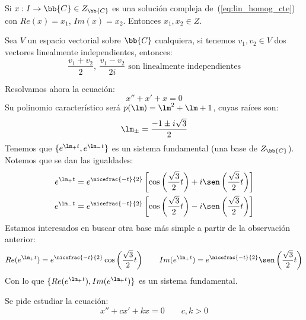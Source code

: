 \begin{prop}
    Si $x:I\rightarrow\bb{C}\in Z_{\bb{C}}$ es una solución compleja de~(\ref{eq:lin_homog_cte}) con $Re(x) = x_1$, $Im(x)=x_2$. Entonces $x_1,x_2\in Z$.
\end{prop}

\begin{observacion}
    Sea $V$ un espacio vectorial sobre $\bb{C}$ cualquiera, si tenemos $v_1,v_2\in V$ dos vectores linealmente independientes, entonces:
    \begin{equation*}
        \dfrac{v_1+v_2}{2},\ \dfrac{v_1-v_2}{2i} \text{\ son linealmente independientes}
    \end{equation*}
\end{observacion}

\begin{ejemplo}
    Resolvamos ahora la ecuación:
    \begin{equation*}
        x'' + x' + x = 0
    \end{equation*}
    Su polinomio característico será $p(\lm) = \lm^2 + \lm + 1$, cuyas raíces son:
    \begin{equation*}
        \lm_{\pm} = \dfrac{-1\pm i\sqrt{3}}{2}
    \end{equation*}
    Tenemos que $\{e^{\lm_+ t}, e^{\lm_- t}\}$ es un sistema fundamental (una base de $Z_{\bb{C}}$). Notemos que se dan las igualdades:
    \begin{align*}
        e^{\lm_+ t} = e^{\nicefrac{-t}{2}}\left[\cos\left(\dfrac{\sqrt{3}}{2}t\right)+i\sen\left(\dfrac{\sqrt{3}}{2}t\right)\right] \\
        e^{\lm_- t} = e^{\nicefrac{-t}{2}}\left[\cos\left(\dfrac{\sqrt{3}}{2}t\right)-i\sen\left(\dfrac{\sqrt{3}}{2}t\right)\right] 
    \end{align*}
    Estamos interesados en buscar otra base más simple a partir de la observación anterior:
    \begin{equation*}
        Re(e^{\lm_+ t}) = e^{\nicefrac{-t}{2}}\cos\left(\dfrac{\sqrt{3}}{2}t\right) \qquad 
        Im(e^{\lm_+ t}) = e^{\nicefrac{-t}{2}}\sen\left(\dfrac{\sqrt{3}}{2}t\right)
    \end{equation*}
    Con lo que $\{Re(e^{\lm_+ t}), Im(e^{\lm_+ t})\}$ es un sistema fundamental.
\end{ejemplo}

\begin{ejercicio*}
    Se pide estudiar la ecuación:
    \begin{equation*}
        x'' + cx' + kx = 0 \qquad c,k > 0
    \end{equation*}
\end{ejercicio*}

